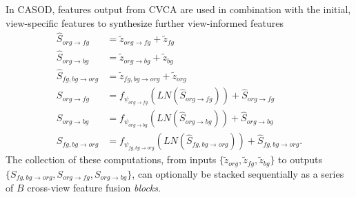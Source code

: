 In CASOD, features output from CVCA are used in combination with the initial, view-specific features to synthesize further view-informed features
\begin{equation}
\begin{split}
	\hat{S}_{org \rightarrow fg} & =  \tilde{z}_{org \rightarrow fg} + \tilde{z}_{fg} \\
	\hat{S}_{org \rightarrow bg} & =  \tilde{z}_{org \rightarrow bg} + \tilde{z}_{bg} \\
	\hat{S}_{fg,bg \rightarrow org} & =  \tilde{z}_{fg,bg \rightarrow org} + \tilde{z}_{org} \\
	S_{org \rightarrow fg} & = f_{\psi_{org \rightarrow fg}} (LN(\hat{S}_{org \rightarrow fg})) + \hat{S}_{org \rightarrow fg} \\
	S_{org \rightarrow bg} & = f_{\psi_{org \rightarrow bg}} (LN(\hat{S}_{org \rightarrow bg})) + \hat{S}_{org \rightarrow bg} \\
	S_{fg,bg \rightarrow org} & = f_{\psi_{fg,bg \rightarrow org}} (LN(\hat{S}_{fg,bg \rightarrow org})) + \hat{S}_{fg,bg \rightarrow org}.
\end{split}
\end{equation}
The collection of these computations, from inputs $\{\tilde{z}_{org}, \tilde{z}_{fg}, \tilde{z}_{bg}\}$ to outputs $\{S_{fg,bg \rightarrow org}, S_{org \rightarrow fg}, S_{org \rightarrow bg}\}$, can optionally be stacked sequentially as a series of $B$ cross-view feature fusion \emph{blocks}.

